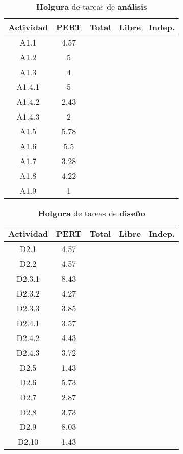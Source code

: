 \documentclass[11pt,a4paper,spanish,twoside]{report}
\begin{document}
{\begin{table}[!h]
  \centering
  \begin{tabular}{|c||c||c|c|c|}
    \hline
    \textbf{Actividad} & \textbf{PERT} & \textbf{Total} & \textbf{Libre}
    & \textbf{Indep.}\\
    \hline \hline
    A1.1 & 4.57 & & & \\ 
    \hline
    A1.2 & 5 & & & \\
    \hline 
    A1.3 & 4 & & & \\
    \hline
    A1.4.1 & 5 & & & \\
    \hline
    A1.4.2 & 2.43 & & & \\
    \hline
    A1.4.3 & 2 & & & \\
    \hline
    A1.5 & 5.78 & & & \\
    \hline
    A1.6 & 5.5 & & & \\
    \hline
    A1.7 & 3.28 & & & \\
    \hline
    A1.8 & 4.22 & & & \\
    \hline
    A1.9 & 1 & & &\\
    \hline
  \end{tabular}
  \caption{\textbf{Holgura} de tareas de \textbf{análisis}} 
  \label{Tab:hol1}
\end{table}

\begin{table}[!h]
\centering
  \begin{tabular}{|c||c||c|c|c|}
    \hline
     \textbf{Actividad} & \textbf{PERT} & \textbf{Total} & \textbf{Libre}
    & \textbf{Indep.}\\
    \hline \hline
    D2.1 & 4.57 & & & \\
    \hline
    D2.2 & 4.57 & & & \\
    \hline
    D2.3.1 & 8.43 & & & \\
    \hline
    D2.3.2 & 4.27 & & & \\
    \hline
    D2.3.3 & 3.85 & & & \\
    \hline
    D2.4.1 & 3.57 & & & \\
    \hline
    D2.4.2 & 4.43 & & & \\
    \hline
    D2.4.3 & 3.72 & & & \\
    \hline
    D2.5 & 1.43 & & & \\
    \hline
    D2.6 & 5.73 & & & \\
    \hline
    D2.7 & 2.87 & & & \\
    \hline
    D2.8 & 3.73 & & &  \\
    \hline
    D2.9 & 8.03 & & & \\
    \hline
    D2.10 & 1.43 & & & \\
    \hline
  \end{tabular}
  \caption{\textbf{Holgura} de tareas de \textbf{diseño}}
  \label{Tab:hol2}
\end{table}

}
\end{document}
